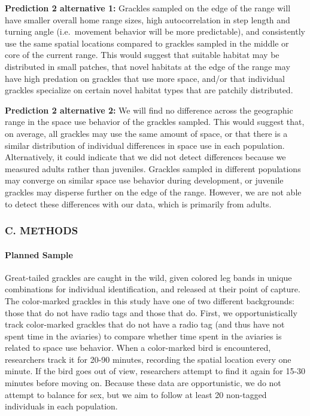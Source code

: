 \documentclass[
]{article}
\begin{document}
\textbf{Prediction 2 alternative 1:} Grackles sampled on the edge of the
range will have smaller overall home range sizes, high autocorrelation
in step length and turning angle (i.e.~movement behavior will be more
predictable), and consistently use the same spatial locations compared
to grackles sampled in the middle or core of the current range. This
would suggest that suitable habitat may be distributed in small patches,
that novel habitats at the edge of the range may have high predation on
grackles that use more space, and/or that individual grackles specialize
on certain novel habitat types that are patchily distributed.

\textbf{Prediction 2 alternative 2:} We will find no difference across
the geographic range in the space use behavior of the grackles sampled.
This would suggest that, on average, all grackles may use the same
amount of space, or that there is a similar distribution of individual
differences in space use in each population. Alternatively, it could
indicate that we did not detect differences because we measured adults
rather than juveniles. Grackles sampled in different populations may
converge on similar space use behavior during development, or juvenile
grackles may disperse further on the edge of the range. However, we are
not able to detect these differences with our data, which is primarily
from adults.

\hypertarget{c.-methods}{%
\subsubsection{C. METHODS}\label{c.-methods}}

\hypertarget{planned-sample}{%
\paragraph{Planned Sample}\label{planned-sample}}

Great-tailed grackles are caught in the wild, given colored leg bands in
unique combinations for individual identification, and released at their
point of capture. The color-marked grackles in this study have one of
two different backgrounds: those that do not have radio tags and those
that do. First, we opportunistically track color-marked grackles that do
not have a radio tag (and thus have not spent time in the aviaries) to
compare whether time spent in the aviaries is related to space use
behavior. When a color-marked bird is encountered, researchers track it
for 20-90 minutes, recording the spatial location every one minute. If
the bird goes out of view, researchers attempt to find it again for
15-30 minutes before moving on. Because these data are opportunistic, we
do not attempt to balance for sex, but we aim to follow at least 20
non-tagged individuals in each population.
\end{document}
